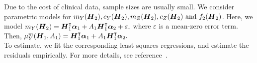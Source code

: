 Due to the cost of clinical data, sample sizes are usually small. We consider parametric models for $m_Y(\boldsymbol{H}_2), c_Y(\boldsymbol{H}_2), m_Z(\boldsymbol{H}_2), c_Z(\boldsymbol{H}_2)\text{ and }f_2(\boldsymbol{H}_2)$. Here, we model $m_{Y}(\boldsymbol{H}_2)=\boldsymbol{H}_1^{\intercal}\boldsymbol{\alpha}_1+A_1\boldsymbol{H}^{\intercal}_1\boldsymbol{\alpha}_2+\varepsilon,$ where $\varepsilon$ is a mean-zero error term. Then, $\mu_Y^m(\boldsymbol{H}_1, A_1) = \boldsymbol{H}_1^{\intercal}\boldsymbol{\alpha}_1+A_1\boldsymbol{H}^{\intercal}_1\boldsymbol{\alpha}_2.$\\

To estimate, we fit the corresponding least squares regressions, and estimate the residuals empirically. For more details, see reference~\cite{constrained}.
